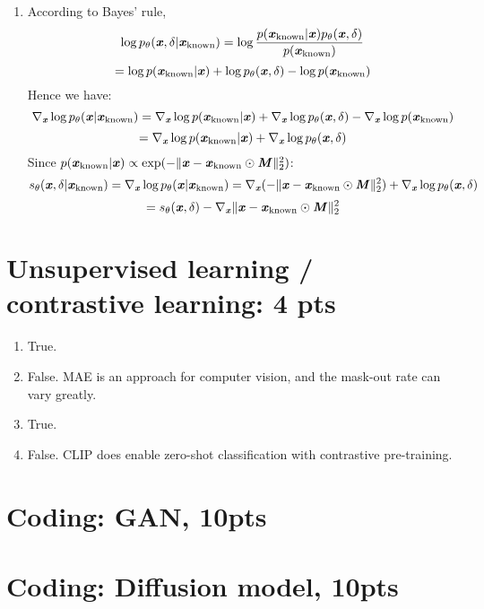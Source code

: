 \documentclass[12pt]{article}
\begin{document}
\begin{enumerate}
    \item According to Bayes' rule, 
    \[\log p_\theta(\textbf{\textit{x}},\delta|\textbf{\textit{x}}_\text{known}) = \log\frac{p(\textbf{\textit{x}}_\text{known}|\textbf{\textit{x}})p_\theta(\textbf{\textit{x}},\delta)}{p(\textbf{\textit{x}}_\text{known})}\] 
    \[= \log p(\textbf{\textit{x}}_\text{known}|\textbf{\textit{x}}) + \log p_\theta(\textbf{\textit{x}},\delta) - \log p(\textbf{\textit{x}}_\text{known})\]
    Hence we have:
    \[\nabla_\textbf{\textit{x}}\log p_\theta(\textbf{\textit{x}}|\textbf{\textit{x}}_\text{known}) = \nabla_\textbf{\textit{x}}\log p(\textbf{\textit{x}}_\text{known}|\textbf{\textit{x}}) + \nabla_\textbf{\textit{x}}\log p_\theta(\textbf{\textit{x}},\delta) - \nabla_\textbf{\textit{x}}\log p(\textbf{\textit{x}}_\text{known})\]
    \[= \nabla_\textbf{\textit{x}}\log p(\textbf{\textit{x}}_\text{known}|\textbf{\textit{x}}) + \nabla_\textbf{\textit{x}}\log p_\theta(\textbf{\textit{x}},\delta)\]
    Since $p(\textbf{\textit{x}}_\text{known}|\textbf{\textit{x}})\propto\exp(-\|\textbf{\textit{x}}-\textbf{\textit{x}}_\text{known}\odot\textbf{\textit{M}}\|^2_2)$:
    \[s_\theta(\textbf{\textit{x}},\delta|\textbf{\textit{x}}_\text{known}) = \nabla_\textbf{\textit{x}}\log p_\theta(\textbf{\textit{x}}|\textbf{\textit{x}}_\text{known}) = \nabla_\textbf{\textit{x}}(-\|\textbf{\textit{x}}-\textbf{\textit{x}}_\text{known}\odot\textbf{\textit{M}}\|_2^2) + \nabla_\textbf{\textit{x}}\log p_\theta(\textbf{\textit{x}},\delta)\]
    \[= s_\theta(\textbf{\textit{x}},\delta) - \nabla_\textbf{\textit{x}}\|\textbf{\textit{x}}-\textbf{\textit{x}}_\text{known}\odot\textbf{\textit{M}}\|_2^2\]
\end{enumerate}
\newpage

\section{Unsupervised learning / contrastive learning: 4 pts}
\begin{enumerate}
    \item True.
    \item False. MAE is an approach for computer vision, and the mask-out rate can vary greatly.
    \item True.
    \item False. CLIP does enable zero-shot classification with contrastive pre-training.
\end{enumerate}
\newpage

\section{Coding: GAN, 10pts}

\newpage

\section{Coding: Diffusion model, 10pts}
\end{document}
